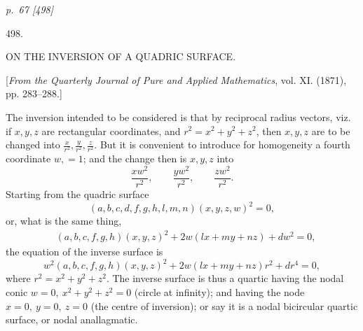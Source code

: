 \documentclass[11pt,a4paper]{article}
\newcommand{\qf}[2]{(#1)(#2)^2}
\begin{document}
\noindent\textit{p.~67 [498]}

\begin{center}
{\Large 498.}

\vspace{1em}
{\large ON THE INVERSION OF A QUADRIC SURFACE.}

\vspace{1em}
[\textit{From the Quarterly Journal of Pure and Applied Mathematics}, vol. XI. (1871),\\
pp. 283--288.]
\end{center}

The inversion intended to be considered is that by reciprocal radius vectors, viz. if
\(x,y,z\) are rectangular coordinates, and \(r^2=x^2+y^2+z^2\), then \(x,y,z\) are to
be changed into \(\frac{x}{r^2},\frac{y}{r^2},\frac{z}{r^2}\). But it is convenient to
introduce for homogeneity a fourth coordinate \(w,=1\); and the change then is
\(x,y,z\) into
\[
  \frac{xw^2}{r^2},\qquad \frac{yw^2}{r^2},\qquad \frac{zw^2}{r^2}.
\]
Starting from the quadric surface
\[
  \qf{a,b,c,d,f,g,h,l,m,n}{x,y,z,w}=0,
\]
or, what is the same thing,
\[
\begin{aligned}
  &\qf{a,b,c,f,g,h}{x,y,z}
  +2w(lx+my+nz)+dw^2=0,
\end{aligned}
\]
the equation of the inverse surface is
\[
  w^2\qf{a,b,c,f,g,h}{x,y,z}
  +2w(lx+my+nz)r^2+dr^4=0,
\]
where \(r^2=x^2+y^2+z^2\). The inverse surface is thus a quartic having the nodal
conic \(w=0,\ x^2+y^2+z^2=0\) (circle at infinity); and having the node
\(x=0,\ y=0,\ z=0\) (the centre of inversion); or say it is a nodal bicircular
quartic surface, or nodal anallagmatic.
\end{document}

